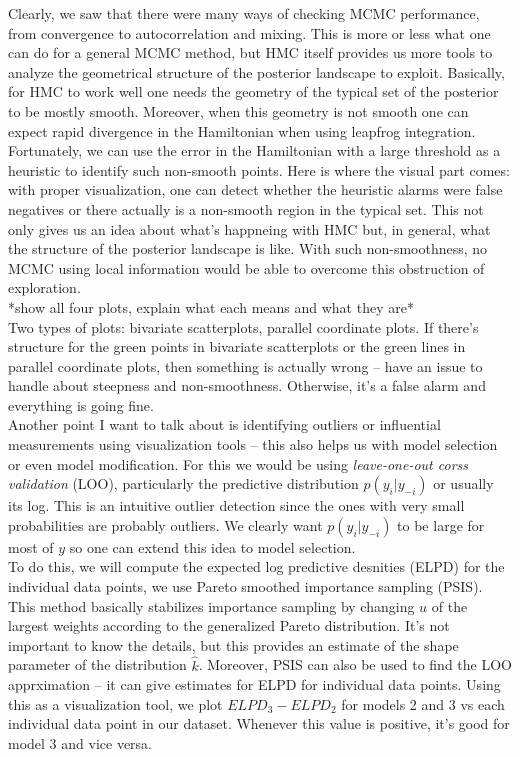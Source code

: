 \documentclass[]{article}
\begin{document}
\noindent Clearly, we saw that there were many ways of checking MCMC performance, from convergence to autocorrelation and mixing.
This is more or less what one can do for a general MCMC method, but HMC itself provides us more tools to analyze the geometrical structure of the posterior landscape to exploit. Basically, for HMC to work well one needs the geometry of the typical set of the posterior to be mostly smooth. Moreover, when this geometry is not smooth one can expect rapid divergence in the Hamiltonian when using leapfrog integration. Fortunately, we can use the error in the Hamiltonian with a large threshold as a heuristic to identify such non-smooth points. Here is where the visual part comes: with proper visualization, one can detect whether the heuristic alarms were false negatives or there actually is a non-smooth region in the typical set. This not only gives us an idea about what's happneing with HMC but, in general, what the structure of the posterior landscape is like. With such non-smoothness, no MCMC using local information would be able to overcome this obstruction of exploration. \\

*show all four plots, explain what each means and what they are*\\

\noindent Two types of plots: bivariate scatterplots, parallel coordinate plots. If there's structure for the green points in bivariate scatterplots or the green lines in parallel coordinate plots, then something is actually wrong -- have an issue to handle about steepness and non-smoothness. Otherwise, it's a false alarm and everything is going fine. \\

\noindent Another point I want to talk about is identifying outliers or influential measurements using visualization tools -- this also helps us with model selection or even model modification. For this we would be using \emph{leave-one-out corss validation} (LOO), particularly the predictive distribution $p(y_i | y_{-i})$ or usually its log. This is an intuitive outlier detection since the ones with very small probabilities are probably outliers. We clearly want $p(y_i | y_{-i})$ to be large for most of $y$ so one can extend this idea to model selection. \\

\noindent To do this, we will compute the expected log predictive desnities (ELPD) for the individual data points, we use Pareto smoothed importance sampling (PSIS). This method basically stabilizes importance sampling by changing $u$ of the largest weights according to the generalized Pareto distribution. It's not important to know the details, but this provides an estimate of the shape parameter of the distribution $\hat{k}$. Moreover, PSIS can also be used to find the LOO apprximation -- it can give estimates for ELPD for individual data points. Using this as a visualization tool, we plot $ELPD_3 - ELPD_2$ for models 2 and 3 vs each individual data point in our dataset. Whenever this value is positive, it's good for model 3 and vice versa. \\
\end{document}
